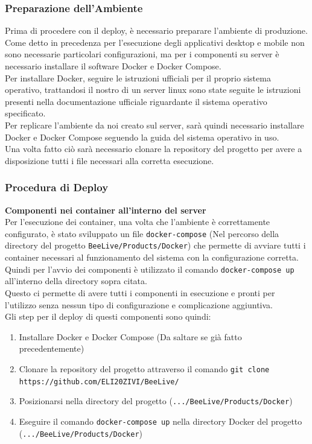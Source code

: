 \documentclass{article}
\begin{document}
\subsubsection{Preparazione dell'Ambiente}
Prima di procedere con il deploy, è necessario preparare l'ambiente di produzione.\\
Come detto in precedenza per l'esecuzione degli applicativi desktop e mobile non sono necessarie particolari configurazioni, ma per i componenti su server è necessario installare il software Docker e Docker Compose.\\
Per installare Docker, seguire le istruzioni ufficiali per il proprio sistema operativo, trattandosi il nostro di un server linux sono state seguite le istruzioni presenti nella documentazione ufficiale riguardante il sistema operativo specificato.\\
Per replicare l'ambiente da noi creato sul server, sarà quindi necessario installare Docker e Docker Compose seguendo la guida del sistema operativo in uso.\\
Una volta fatto ciò sarà necessario clonare la repository del progetto per avere a disposizione tutti i file necessari alla corretta esecuzione.

\subsubsection{Procedura di Deploy}
\textbf{Componenti nei container all'interno del server}\\
Per l'esecuzione dei container, una volta che l'ambiente è correttamente configurato, è stato sviluppato un file \texttt{docker-compose} (Nel percorso della directory del progetto \texttt{BeeLive/Products/Docker}) che permette di avviare tutti i container necessari al funzionamento del sistema con la configurazione corretta.\\
Quindi per l'avvio dei componenti è utilizzato il comando \texttt{docker-compose up} all'interno della directory sopra citata.\\
Questo ci permette di avere tutti i componenti in esecuzione e pronti per l'utilizzo senza nessun tipo di configurazione e complicazione aggiuntiva.\\

\noindent Gli step per il deploy di questi componenti sono quindi:
\begin{enumerate}
    \item Installare Docker e Docker Compose (Da saltare se già fatto precedentemente)
    \item Clonare la repository del progetto attraverso il comando \texttt{git clone https://github.com/ELI20ZIVI/BeeLive/}
    \item Posizionarsi nella directory del progetto (\texttt{.../BeeLive/Products/Docker})
    \item Eseguire il comando \texttt{docker-compose up} nella directory Docker del progetto (\texttt{.../BeeLive/Products/Docker})
\end{enumerate}
\end{document}
